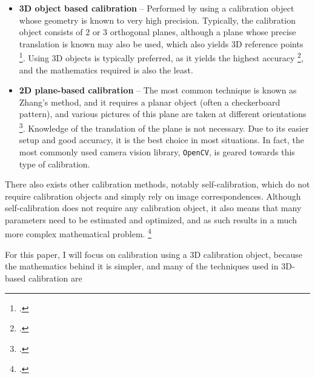 \begin{itemize}[leftmargin=!, itemindent=-4ex]
    \item \textbf{3D object based calibration} -- Performed by using a calibration object whose geometry is known to very high precision. Typically, the calibration object consists of 2 or 3 orthogonal planes, although a plane whose precise translation is known may also be used, which also yields 3D reference points \footcite{zhangCameraCalibration2007}. Using 3D objects is typically preferred, as it yields the highest accuracy \footcite{zhangCameraCalibration2007}, and the mathematics required is also the least. 
    \item \textbf{2D plane-based calibration} -- The most common technique is known as Zhang's method, and it requires a planar object (often a checkerboard pattern), and various pictures of this plane are taken at different orientations \footcite{zhangFlexibleNew2000}. Knowledge of the translation of the plane is not necessary. Due to its easier setup and good accuracy, it is the best choice in most situations. In fact, the most commonly used camera vision library, \texttt{OpenCV}, is geared towards this type of calibration. 
\end{itemize}

There also exists other calibration methods, notably self-calibration, which do not require calibration objects and simply rely on image correspondences. Although self-calibration does not require any calibration object, it also means that many parameters need to be estimated and optimized, and as such results in a much more complex mathematical problem. \footcite{zhangCameraCalibration2007}

For this paper, I will focus on calibration using a 3D calibration object, because the mathematics behind it is simpler, and many of the techniques used in 3D-based calibration are 
